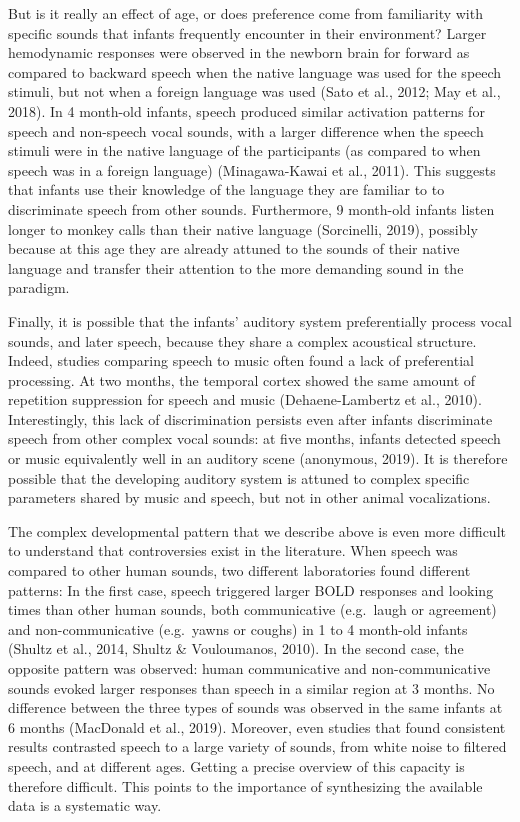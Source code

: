 \documentclass[man]{apa6}
\begin{document}
But is it really an effect of age, or does preference come from
familiarity with specific sounds that infants frequently encounter in
their environment? Larger hemodynamic responses were observed in the
newborn brain for forward as compared to backward speech when the native
language was used for the speech stimuli, but not when a foreign
language was used (Sato et al., 2012; May et al., 2018). In 4 month-old
infants, speech produced similar activation patterns for speech and
non-speech vocal sounds, with a larger difference when the speech
stimuli were in the native language of the participants (as compared to
when speech was in a foreign language) (Minagawa-Kawai et al., 2011).
This suggests that infants use their knowledge of the language they are
familiar to to discriminate speech from other sounds. Furthermore, 9
month-old infants listen longer to monkey calls than their native
language (Sorcinelli, 2019), possibly because at this age they are
already attuned to the sounds of their native language and transfer
their attention to the more demanding sound in the paradigm.

Finally, it is possible that the infants' auditory system preferentially
process vocal sounds, and later speech, because they share a complex
acoustical structure. Indeed, studies comparing speech to music often
found a lack of preferential processing. At two months, the temporal
cortex showed the same amount of repetition suppression for speech and
music (Dehaene-Lambertz et al., 2010). Interestingly, this lack of
discrimination persists even after infants discriminate speech from
other complex vocal sounds: at five months, infants detected speech or
music equivalently well in an auditory scene (anonymous, 2019). It is
therefore possible that the developing auditory system is attuned to
complex specific parameters shared by music and speech, but not in other
animal vocalizations.

The complex developmental pattern that we describe above is even more
difficult to understand that controversies exist in the literature. When
speech was compared to other human sounds, two different laboratories
found different patterns: In the first case, speech triggered larger
BOLD responses and looking times than other human sounds, both
communicative (e.g.~laugh or agreement) and non-communicative
(e.g.~yawns or coughs) in 1 to 4 month-old infants (Shultz et al., 2014,
Shultz \& Vouloumanos, 2010). In the second case, the opposite pattern
was observed: human communicative and non-communicative sounds evoked
larger responses than speech in a similar region at 3 months. No
difference between the three types of sounds was observed in the same
infants at 6 months (MacDonald et al., 2019). Moreover, even studies
that found consistent results contrasted speech to a large variety of
sounds, from white noise to filtered speech, and at different ages.
Getting a precise overview of this capacity is therefore difficult. This
points to the importance of synthesizing the available data is a
systematic way.
\end{document}
